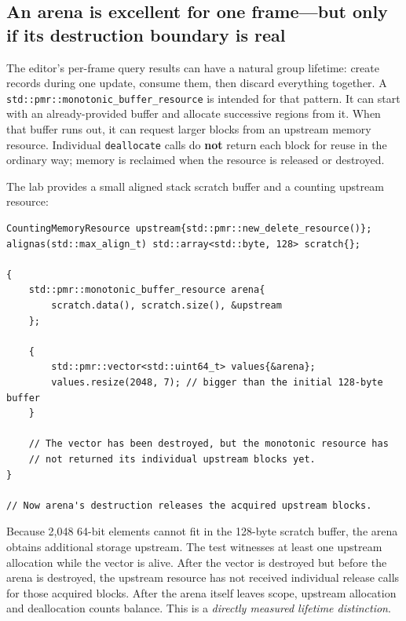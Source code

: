 \subsection{An arena is excellent for one frame---but only if its destruction boundary is real}\label{05-engine-i-ch006-an-arena-is-excellent-for-one-framebut-only-if-its-destruction-boundary-is-real}

The editor's per-frame query results can have a natural group lifetime: create records during one update, consume them, then discard everything together. A \texttt{std::pmr::monotonic\_buffer\_resource} is intended for that pattern. It can start with an already-provided buffer and allocate successive regions from it. When that buffer runs out, it can request larger blocks from an upstream memory resource. Individual \texttt{deallocate} calls do \textbf{not} return each block for reuse in the ordinary way; memory is reclaimed when the resource is released or destroyed.

The lab provides a small aligned stack scratch buffer and a counting upstream resource:

\begin{verbatim}
CountingMemoryResource upstream{std::pmr::new_delete_resource()};
alignas(std::max_align_t) std::array<std::byte, 128> scratch{};

{
    std::pmr::monotonic_buffer_resource arena{
        scratch.data(), scratch.size(), &upstream
    };

    {
        std::pmr::vector<std::uint64_t> values{&arena};
        values.resize(2048, 7); // bigger than the initial 128-byte buffer
    }

    // The vector has been destroyed, but the monotonic resource has
    // not returned its individual upstream blocks yet.
}

// Now arena's destruction releases the acquired upstream blocks.
\end{verbatim}

Because 2,048 64-bit elements cannot fit in the 128-byte scratch buffer, the arena obtains additional storage upstream. The test witnesses at least one upstream allocation while the vector is alive. After the vector is destroyed but before the arena is destroyed, the upstream resource has not received individual release calls for those acquired blocks. After the arena itself leaves scope, upstream allocation and deallocation counts balance. This is a \emph{directly measured lifetime distinction}.

